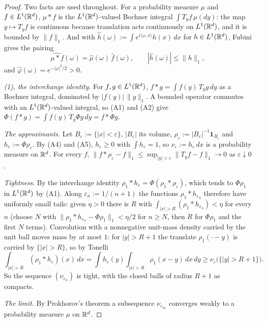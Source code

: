 \begin{proof}
\leanok
Two facts are used throughout. For a probability measure $\mu$ and $f \in L^1(\mathbb{R}^d)$, $\mu * f$
is the $L^1(\mathbb{R}^d)$-valued Bochner integral $\int T_yf\,\mu(dy)$: the map $y \mapsto T_yf$ is
continuous because translation acts continuously on $L^1(\mathbb{R}^d)$, and it is bounded by
$\|f\|_1$. And with $\widehat h(\omega) := \int e^{i\langle\omega,x\rangle}h(x)\,dx$ for
$h \in L^1(\mathbb{R}^d)$, Fubini gives the pairing
\[
  \widehat{\mu * f}(\omega) = \widehat\mu(\omega)\,\widehat f(\omega),
  \qquad |\widehat h(\omega)| \le \|h\|_1 ,
\]
and $\widehat\varphi(\omega) = e^{-|\omega|^2/2} > 0$.

\emph{(1), the interchange identity.} For $f, g \in L^1(\mathbb{R}^d)$, $f * g = \int f(y)\,T_yg\,dy$ as
a Bochner integral, dominated by $|f(y)|\,\|g\|_1$. A bounded operator commutes with an
$L^1(\mathbb{R}^d)$-valued integral, so (A1) and (A2) give $\Phi(f * g) = \int f(y)\,T_y\Phi g\,dy
= f * \Phi g$.

\emph{The approximants.} Let $B_\varepsilon := \{|x| < \varepsilon\}$, $|B_\varepsilon|$ its
volume, $\rho_\varepsilon := |B_\varepsilon|^{-1}\mathbf 1_{B_\varepsilon}$ and
$h_\varepsilon := \Phi\rho_\varepsilon$. By (A4) and (A5), $h_\varepsilon \ge 0$ with
$\int h_\varepsilon = 1$, so $\nu_\varepsilon := h_\varepsilon\,dx$ is a probability measure on
$\mathbb{R}^d$. For every $f$, $\|f * \rho_\varepsilon - f\|_1 \le \sup_{|y| < \varepsilon}
\|T_yf - f\|_1 \to 0$ as $\varepsilon \downarrow 0$.

\emph{Tightness.} By the interchange identity $\rho_1 * h_\varepsilon = \Phi(\rho_1 *
\rho_\varepsilon)$, which tends to $\Phi\rho_1$ in $L^1(\mathbb{R}^d)$ by (A1). Along
$\varepsilon_n := 1/(n+1)$ the functions $\rho_1 * h_{\varepsilon_n}$ therefore have uniformly
small tails: given $\eta > 0$ there is $R$ with $\int_{|x| > R}(\rho_1 * h_{\varepsilon_n}) < \eta$
for every $n$ (choose $N$ with $\|\rho_1 * h_{\varepsilon_n} - \Phi\rho_1\|_1 < \eta/2$ for
$n \ge N$, then $R$ for $\Phi\rho_1$ and the first $N$ terms). Convolution with a nonnegative
unit-mass density carried by the unit ball moves mass by at most $1$: for $|y| > R + 1$ the
translate $\rho_1(\cdot - y)$ is carried by $\{|x| > R\}$, so by Tonelli
\[
  \int_{|x| > R}(\rho_1 * h_\varepsilon)(x)\,dx
  = \int h_\varepsilon(y)\int_{|x| > R}\rho_1(x - y)\,dx\,dy
  \ge \nu_\varepsilon\bigl(\{|y| > R + 1\}\bigr) .
\]
So the sequence $(\nu_{\varepsilon_n})$ is tight, with the closed balls of radius $R + 1$ as
compacts.

\emph{The limit.} By Prokhorov's theorem a subsequence $\nu_{\varepsilon_{n_k}}$ converges weakly
to a probability measure $\mu$ on $\mathbb{R}^d$.


\end{proof}
